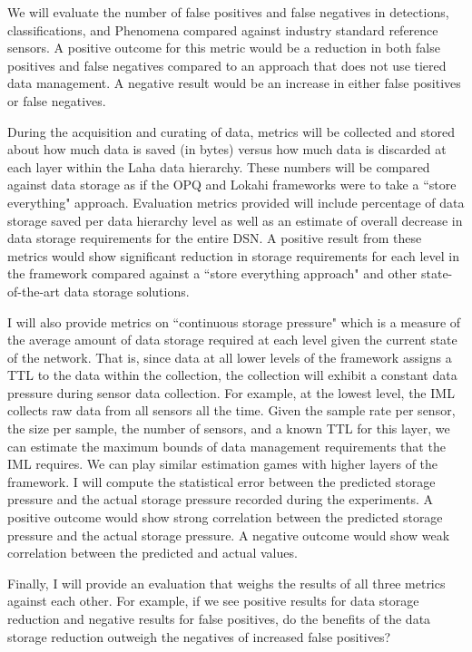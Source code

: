 We will evaluate the number of false positives and false negatives in detections, classifications, and Phenomena compared against industry standard reference sensors. A positive outcome for this metric would be a reduction in both false positives and false negatives compared to an approach that does not use tiered data management. A negative result would be an increase in either false positives or false negatives. 

During the acquisition and curating of data, metrics will be collected and stored about how much data is saved (in bytes) versus how much data is discarded at each layer within the Laha data hierarchy. These numbers will be compared against data storage as if the OPQ and Lokahi frameworks were to take a ``store everything" approach. Evaluation metrics provided will include percentage of data storage saved per data hierarchy level as well as an estimate of overall decrease in data storage requirements for the entire DSN. A positive result from these metrics would show significant reduction in storage requirements for each level in the framework compared against a ``store everything approach" and other state-of-the-art data storage solutions.

I will also provide metrics on ``continuous storage pressure" which is a measure of the average amount of data storage required at each level given the current state of the network. That is, since data at all lower levels of the framework assigns a TTL to the data within the collection, the collection will exhibit a constant data pressure during sensor data collection. For example, at the lowest level, the IML collects raw data from all sensors all the time. Given the sample rate per sensor, the size per sample, the number of sensors, and a known TTL for this layer, we can estimate the maximum bounds of data management requirements that the IML requires. We can play similar estimation games with higher layers of the framework. I will compute the statistical error between the predicted storage pressure and the actual storage pressure recorded during the experiments. A positive outcome would show strong correlation between the predicted storage pressure and the actual storage pressure. A negative outcome would show weak correlation between the predicted and actual values.

Finally, I will provide an evaluation that weighs the results of all three metrics against each other. For example, if we see positive results for data storage reduction and negative results for false positives, do the benefits of the data storage reduction outweigh the negatives of increased false positives?

